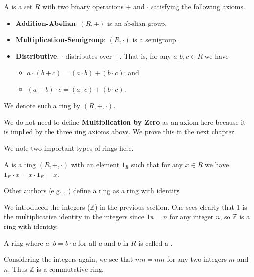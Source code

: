 \begin{definition}
    A  is a set $R$ with two binary operations $+$ and $\cdot$ satisfying the following axioms.
    \begin{itemize}
        \item \textbf{Addition-Abelian}: $(R, +)$ is an abelian group.
        \item \textbf{Multiplication-Semigroup}: $(R, \cdot)$ is a semigroup.
        \item \textbf{Distributive}: $\cdot$ distributes over $+$. That is, for any $a, b, c \in R$ we have
        \begin{itemize}
            \item $a \cdot (b + c) = (a \cdot b) + (b \cdot c)$; and
            \item $(a + b) \cdot c = (a \cdot c) + (b \cdot c)$.
        \end{itemize}
    \end{itemize}
    We denote such a ring by $(R, +, \cdot)$.
\end{definition}
\begin{remark}
    We do not need to define \textbf{Multiplication by Zero} as an axiom here because it is implied by the three ring axioms above. We prove this in the next chapter.
\end{remark}

We note two important types of rings here.
\begin{definition}
    A  is a ring $(R, +, \cdot)$ with an element $1_R$ such that for any $x \in R$ we have $1_R \cdot x = x \cdot 1_R = x$.
\end{definition}
\begin{remark}
    Other authors (e.g. \cite[p.~136]{cohn_1982}, \cite[pp.~145--146]{clark_1984}) define a ring as a ring with identity.
\end{remark}
\begin{example}
    We introduced the integers ($\mathbb{Z}$) in the previous section. One sees clearly that 1 is the multiplicative identity in the integers since $1n = n$ for any integer $n$, so $\mathbb{Z}$ is a ring with identity.
\end{example}

\begin{definition}
    A ring where $a \cdot b = b \cdot a$ for all $a$ and $b$ in $R$ is called a .
\end{definition}
\begin{example}
    Considering the integers again, we see that $mn = nm$ for any two integers $m$ and $n$. Thus $\mathbb{Z}$ is a commutative ring.
\end{example}


